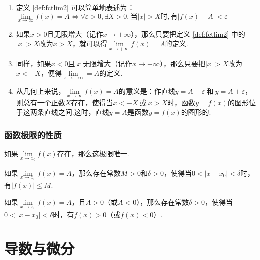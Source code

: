 \documentclass[lang=cn,10pt]{elegantbook}
\begin{document}
\begin{note}
	\begin{enumerate}
		\item 定义 \ref{def:fctlim2} 可以简单地表述为：\( \lim\limits_{x \to \infty}f(x) = A \Leftrightarrow \forall \varepsilon > 0, \exists X > 0,\text{当}|x|>X\text{时},\text{有}|f(x) - A| < \varepsilon \)
		\item 如果\( x > 0 \)且无限增大（记作\( x \to +\infty \)），那么只要把定义 \ref{def:fctlim2} 中的\( |x| > X \)改为\( x > X \)，就可以得\( \lim\limits_{x \to +\infty}f(x) = A \)的定义.
		\item 同样，如果\( x < 0 \)且\( |x| \)无限增大（记作\( x \to -\infty \)），那么只要把\( |x| > X \)改为\( x < -X \)，便得\( \lim\limits_{x \to -\infty} = A \)的定义.
		\item 从几何上来说，\( \lim\limits_{x \to \infty}f(x) = A \)的意义是：作直线\( y = A - \varepsilon\ \text{和}\ y = A + \varepsilon \)，则总有一个正数\( X \)存在，使得当\( x < -X\ \text{或}\ x > X \)时，函数\( y = f(x) \)的图形位于这两条直线之间.这时，直线\( y = A \)是函数\( y = f(x) \)的图形的.
	\end{enumerate}
\end{note}

\subsection{函数极限的性质}

\begin{theorem}[唯一性]
	如果\( \lim\limits_{x \to x_{0}}f(x) \)存在，那么这极限唯一.
\end{theorem}
\begin{theorem}[局部有界性]
	如果\( \lim\limits_{x \to x_{0}}f(x) = A \)，那么存在常数\( M > 0 \)和\( \delta > 0 \)，使得当\( 0 < |x - x_{0}| < \delta \)时，有\( |f(x)| \leqslant M \).
\end{theorem}
\begin{theorem}[局部保号性]
	如果\( \lim\limits_{x \to x_{0}}f(x) = A \)，且\( A > 0 \)（或\( A < 0 \)），那么存在常数\( \delta > 0 \)，使得当\( 0 < |x - x_{0}| < \delta \)时，有\( f(x) > 0 \)（或\( f(x) < 0 \)）.
\end{theorem}









\chapter{导数与微分}
\end{document}
